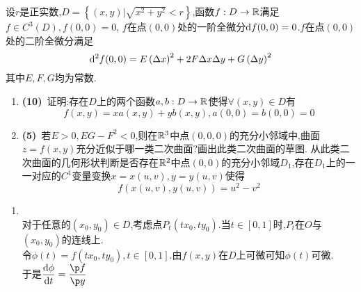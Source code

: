 \documentclass{ctexart}
\begin{document}
\begin{problem}[9.(15\songti{分})]
    设$r$是正实数,$D=\left\{(x,y)\vert\sqrt{x^2+y^2}<r\right\}$,函数$f:D\to\mathbb{R}$满足$f\in C^3(D),f(0,0)=0$,
    $f$在点$(0,0)$处的一阶全微分$\mathrm{d} f(0,0)=0$.$f$在点$(0,0)$处的二阶全微分满足
    $$\mathrm{d}^2f(0,0)=E\left(\Delta x\right)^2+2F\Delta x\Delta y+G\left(\Delta y\right)^2$$
    其中$E,F,G$均为常数.
    \begin{enumerate}[label=\textbf{(\arabic*)},leftmargin=*]
        \item \textbf{(10)}\ 证明:存在$D$上的两个函数$a,b:D\to\mathbb{R}$使得$\forall (x,y)\in D$有$$f(x,y)=xa(x,y)+yb(x,y),a(0,0)=b(0,0)=0$$
        \item \textbf{(5)}\ 若$E>0,EG-F^2<0$,则在$\mathbb{R}^3$中点$(0,0,0)$的充分小邻域中,曲面$z=f(x,y)$充分近似于哪一类二次曲面?画出此类二次曲面的草图.
            从此类二次曲面的几何形状判断是否存在$\mathbb{R}^2$中点$(0,0)$的充分小邻域$D_1$,存在$D_1$上的一一对应的$C^1$变量变换$x=x(u,v),y=y(u,v)$使得
            $$f(x(u,v),y(u,v))=u^2-v^2$$
    \end{enumerate}
\end{problem}
\begin{solution}
    \begin{enumerate}[label=\textbf{(\arabic*)},leftmargin=*]
        \item {}\\
            对于任意的$(x_0,y_0)\in D$,考虑点$P_t(tx_0,ty_0)$.当$t\in[0,1]$时,$P_t$在$O$与$(x_0,y_0)$的连线上.\\
            令$\phi(t)=f(tx_0,ty_0),t\in[0,1]$.由$f(x,y)$在$D$上可微可知$\phi(t)$可微.\\
            于是$\dfrac{\di\phi}{\di t}=\dfrac{\p f}{\p y}$
    \end{enumerate}
\end{solution}
\end{document}
